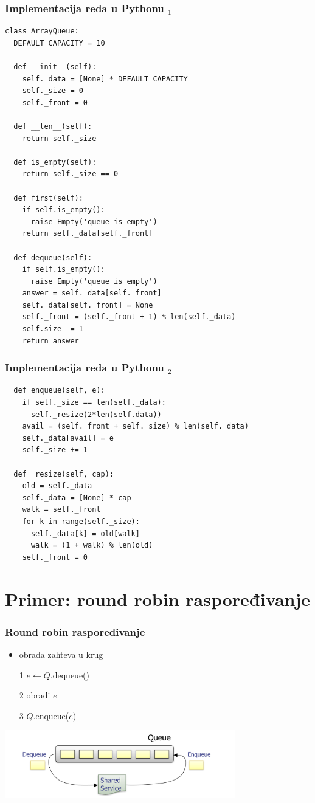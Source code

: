 \documentclass[compress]{beamer}
\begin{document}
\begin{frame}[fragile,shrink=10]
  \frametitle{Implementacija reda u Pythonu $_1$}
\begin{verbatim}
class ArrayQueue:
  DEFAULT_CAPACITY = 10

  def __init__(self):
    self._data = [None] * DEFAULT_CAPACITY
    self._size = 0
    self._front = 0
    
  def __len__(self):
    return self._size
  
  def is_empty(self):
    return self._size == 0
    
  def first(self):
    if self.is_empty():
      raise Empty('queue is empty')
    return self._data[self._front]

  def dequeue(self):
    if self.is_empty():
      raise Empty('queue is empty')
    answer = self._data[self._front]
    self._data[self._front] = None
    self._front = (self._front + 1) % len(self._data)
    self.size -= 1
    return answer
\end{verbatim}
\end{frame}

\begin{frame}[fragile,shrink=10]
  \frametitle{Implementacija reda u Pythonu $_2$}
\begin{verbatim}
  def enqueue(self, e):
    if self._size == len(self._data):
      self._resize(2*len(self.data))
    avail = (self._front + self._size) % len(self._data)
    self._data[avail] = e
    self._size += 1
    
  def _resize(self, cap):
    old = self._data
    self._data = [None] * cap
    walk = self._front
    for k in range(self._size):
      self._data[k] = old[walk]
      walk = (1 + walk) % len(old)
    self._front = 0 
\end{verbatim}
\end{frame}

\section[P: Round Robin]{Primer: round robin raspoređivanje}
\begin{frame}[fragile]
  \frametitle{Round robin raspoređivanje}
  \begin{itemize}
    \item obrada zahteva u krug
    \item[1] $e \leftarrow Q$.dequeue()
    \item[2] obradi $e$
    \item[3] $Q$.enqueue($e$)
  \end{itemize}
\begin{center}
  \includegraphics[width=10cm]{asp-06-pic03.png}
\end{center}
\end{frame}
\end{document}

